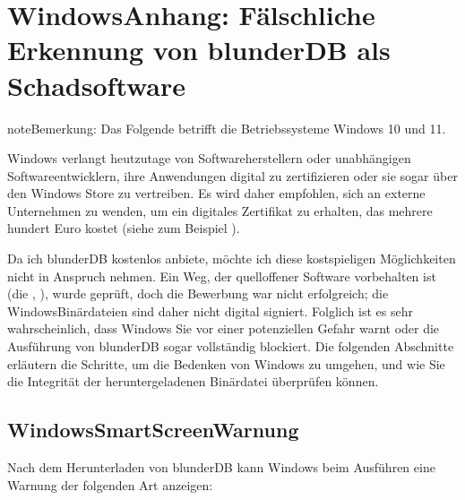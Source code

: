 \documentclass[letterpaper,10pt,german]{sphinxmanual}
\begin{document}
\section{Windows\sphinxhyphen{}Anhang: Fälschliche Erkennung von blunderDB als Schadsoftware}
\label{\detokenize{annexe_windows_securite:annexe-windows-detection-abusive-de-blunderdb-comme-logiciel-malveillant}}\label{\detokenize{annexe_windows_securite:annexe-windows-malware}}\label{\detokenize{annexe_windows_securite::doc}}
\begin{sphinxadmonition}{note}{Bemerkung:}
\sphinxAtStartPar
Das Folgende betrifft die Betriebssysteme Windows 10 und 11.
\end{sphinxadmonition}

\sphinxAtStartPar
Windows verlangt heutzutage von Softwareherstellern oder unabhängigen Softwareentwicklern, ihre Anwendungen digital zu zertifizieren oder sie sogar über den Windows Store zu vertreiben. Es wird daher empfohlen, sich an externe Unternehmen zu wenden, um ein digitales Zertifikat zu erhalten, das mehrere hundert Euro kostet (siehe zum Beispiel  ).

\sphinxAtStartPar
Da ich blunderDB kostenlos anbiete, möchte ich diese kostspieligen Möglichkeiten nicht in Anspruch nehmen. Ein  Weg, der quelloffener Software vorbehalten ist (die , ), wurde geprüft, doch die Bewerbung war nicht erfolgreich; die Windows\sphinxhyphen{}Binärdateien sind daher nicht digital signiert. Folglich ist es sehr wahrscheinlich, dass Windows Sie vor einer potenziellen Gefahr warnt oder die Ausführung von blunderDB sogar vollständig blockiert. Die folgenden Abschnitte erläutern die Schritte, um die Bedenken von Windows zu umgehen, und wie Sie die Integrität der heruntergeladenen Binärdatei überprüfen können.


\subsection{Windows\sphinxhyphen{}SmartScreen\sphinxhyphen{}Warnung}
\label{\detokenize{annexe_windows_securite:avertissement-windows-smartscreen}}
\sphinxAtStartPar
Nach dem Herunterladen von blunderDB kann Windows beim Ausführen eine Warnung der folgenden Art anzeigen:

\begin{figure}[htbp]
\centering

\noindent{}
\end{figure}
\end{document}
